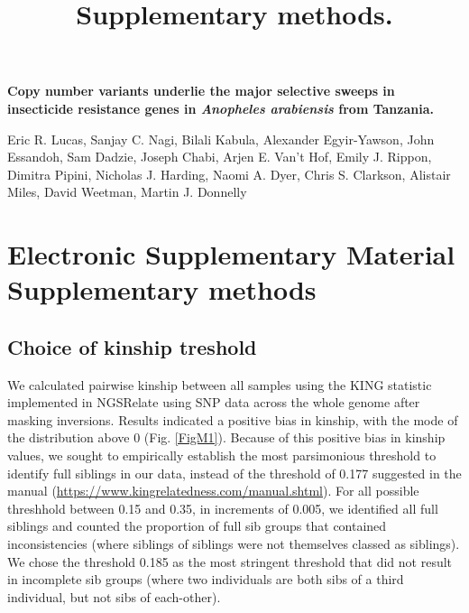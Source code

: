 \documentclass[a4paper,12pt]{article}
\title{Supplementary methods.}
\begin{document}
\onehalfspacing

\begin{center}
	\Large
	\noindent \textbf{Copy number variants underlie the major selective sweeps in insecticide resistance genes in \textit{Anopheles arabiensis} from Tanzania.}

	\normalsize

	\vskip 3cm

\end{center}

\noindent Eric R. Lucas, Sanjay C. Nagi, Bilali Kabula, Alexander Egyir-Yawson, John Essandoh, Sam Dadzie, Joseph Chabi, Arjen E. Van’t Hof, Emily J. Rippon, Dimitra Pipini, Nicholas J. Harding, Naomi A. Dyer, Chris S. Clarkson, Alistair Miles, David Weetman, Martin J. Donnelly 
 
\vskip 2cm 


\section*{Electronic Supplementary Material \\ Supplementary methods}

\clearpage

\subsection{Choice of kinship treshold}

We calculated pairwise kinship between all samples using the KING statistic \parencite{Man10} implemented in NGSRelate \parencite{Kor15} using SNP data across the whole genome after masking inversions. Results indicated a positive bias in kinship, with the mode of the distribution above 0 (Fig. \ref{FigM1}). Because of this positive bias in kinship values, we sought to empirically establish the most parsimonious threshold to identify full siblings in our data, instead of the threshold of 0.177 suggested in the manual (\url{https://www.kingrelatedness.com/manual.shtml}). For all possible threshhold between 0.15 and 0.35, in increments of 0.005, we identified all full siblings and counted the proportion of full sib groups that contained inconsistencies (where siblings of siblings were not themselves classed as siblings). We chose the threshold 0.185 as the most stringent threshold that did not result in incomplete sib groups (where two individuals are both sibs of a third individual, but not sibs of each-other). 
\end{document}
